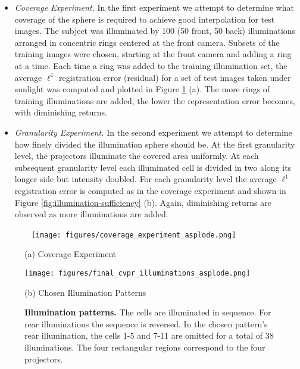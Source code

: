 \documentclass[10pt,twocolumn,letterpaper]{article}
\begin{document}
\begin{itemize}
\item {\em Coverage Experiment.} In the first experiment we attempt to determine what coverage of the sphere is required to achieve good interpolation for test images.  The subject was illuminated by 100 (50 front, 50 back) illuminations arranged in concentric rings centered at the front camera.  Subsets of the training images were chosen, starting at the front camera and adding a ring at a time.  Each time a ring was added to the training illumination set, the average $\ell^1$ registration error (residual) for a set of test images taken under sunlight was computed and plotted in Figure \ref{fig:illumination-patterns} (a).  The more rings of training illuminations are added, the lower the representation error becomes, with diminishing returns.\vspace{-2mm}
\item {\em Granularity Experiment.} In the second experiment we attempt to determine how finely divided the illumination sphere should be.  At the first granularity level, the projectors  illuminate the covered area uniformly.  At each subsequent granularity level each illuminated cell is divided in two along its longer side but intensity doubled.  For each granularity level the average $\ell^1$ registration error is computed as in the coverage experiment and shown in Figure \ref{fig:illumination-sufficiency} (b).  Again, diminishing returns are observed as more illuminations are added.\vspace{-3mm}  
\end{itemize}
\begin{figure}[h]
\begin{minipage}{1.5in}~\hspace{-0mm}
\texttt{[image: figures/coverage\_experiment\_asplode.png]}
\centerline{\small (a) Coverage Experiment}
\end{minipage}\hspace{5mm}
\begin{minipage}{1.5in}
\texttt{[image: figures/final\_cvpr\_illuminations\_asplode.png]}
\centerline{\small (b) Chosen Illumination Patterns}
\end{minipage}
\vspace{.1in}
\caption{{\bf Illumination patterns.}   The cells are illuminated in sequence.  For rear illuminations the sequence is reversed.  In the chosen pattern's rear illumination, the cells 1-5 and 7-11 are omitted for a total of 38 illuminations. The four rectangular regions correspond to the four projectors.\vspace{-3mm}}
\label{fig:illumination-patterns}
\end{figure}
\end{document}
